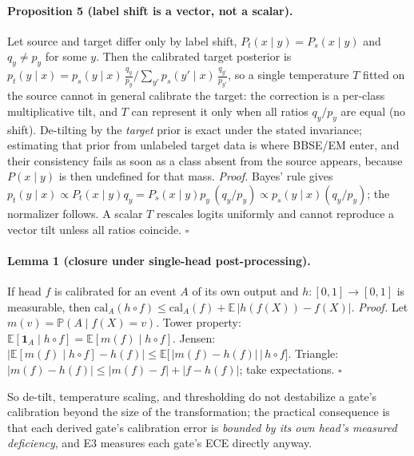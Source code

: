 \documentclass[sigconf,anonymous=false]{acmart}
\begin{document}
\paragraph{Proposition 5 (label shift is a vector, not a scalar).} Let source and target differ only by label shift, $P_t(x\mid y)=P_s(x\mid y)$ and $q_y \neq p_y$ for some $y$. Then the calibrated target posterior is
$p_t(y\mid x) = p_s(y\mid x)\,\frac{q_y}{p_y}\big/\sum_{y'} p_s(y'\mid x)\,\frac{q_{y'}}{p_{y'}}$,
so a single temperature $T$ fitted on the source cannot in general calibrate the target: the correction is a per-class multiplicative tilt, and $T$ can represent it only when all ratios $q_y/p_y$ are equal (no shift). De-tilting by the \emph{target} prior is exact under the stated invariance; estimating that prior from unlabeled target data is where BBSE/EM enter, and their consistency fails as soon as a class absent from the source appears, because $P(x\mid y)$ is then undefined for that mass. \emph{Proof.} Bayes' rule gives $p_t(y\mid x) \propto P_t(x\mid y)q_y = P_s(x\mid y)p_y\,(q_y/p_y) \propto p_s(y\mid x)(q_y/p_y)$; the normalizer follows. A scalar $T$ rescales logits uniformly and cannot reproduce a vector tilt unless all ratios coincide. \hfill$\square$


\paragraph{Lemma 1 (closure under single-head post-processing).} If head $f$ is calibrated for an event $A$ of its own output and $h:[0,1]\to[0,1]$ is measurable, then
$\mathrm{cal}_A(h\!\circ\!f) \le \mathrm{cal}_A(f) + \mathbb{E}\,|h(f(X)) - f(X)|.$
\emph{Proof.} Let $m(v) = \mathbb{P}(A \mid f(X){=}v)$. Tower property: $\mathbb{E}[\mathbf{1}_A \mid h\circ f] = \mathbb{E}[m(f)\mid h\circ f]$. Jensen: $\big|\mathbb{E}[m(f)\mid h\circ f] - h(f)\big| \le \mathbb{E}\big[\,|m(f)-h(f)|\,\big|\,h\circ f\big]$. Triangle: $|m(f)-h(f)| \le |m(f)-f| + |f-h(f)|$; take expectations. \hfill$\square$

So de-tilt, temperature scaling, and thresholding do not destabilize a gate's calibration beyond the size of the transformation; the practical consequence is that each derived gate's calibration error is \emph{bounded by its own head's measured deficiency}, and E3 measures each gate's ECE directly anyway.
\end{document}
